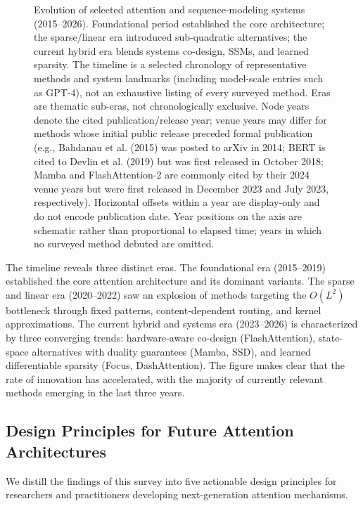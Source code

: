 \documentclass[10pt,twocolumn]{article}
\begin{document}
\begin{figure}[!tbp]
\centering
\resizebox{\textwidth}{!}{}
\caption{Evolution of selected attention and sequence-modeling systems (2015--2026). Foundational period established the core architecture; the sparse/linear era introduced sub-quadratic alternatives; the current hybrid era blends systems co-design, SSMs, and learned sparsity. The timeline is a selected chronology of representative methods and system landmarks (including model-scale entries such as GPT-4), not an exhaustive listing of every surveyed method. Eras are thematic sub-eras, not chronologically exclusive. Node years denote the cited publication/release year; venue years may differ for methods whose initial public release preceded formal publication (e.g., Bahdanau et al. (2015) was posted to arXiv in 2014; BERT is cited to Devlin et al. (2019) but was first released in October 2018; Mamba and FlashAttention-2 are commonly cited by their 2024 venue years but were first released in December 2023 and July 2023, respectively). Horizontal offsets within a year are display-only and do not encode publication date. Year positions on the axis are schematic rather than proportional to elapsed time; years in which no surveyed method debuted are omitted.}
\label{fig:timeline}
\end{figure}

The timeline reveals three distinct eras. The foundational era (2015--2019) established the core attention architecture and its dominant variants. The sparse and linear era (2020--2022) saw an explosion of methods targeting the $O(L^2)$ bottleneck through fixed patterns, content-dependent routing, and kernel approximations. The current hybrid and systems era (2023--2026) is characterized by three converging trends: hardware-aware co-design (FlashAttention), state-space alternatives with duality guarantees (Mamba, SSD), and learned differentiable sparsity (Focus, DashAttention). The figure makes clear that the rate of innovation has accelerated, with the majority of currently relevant methods emerging in the last three years.

\subsection*{Design Principles for Future Attention Architectures}

We distill the findings of this survey into five actionable design principles for researchers and practitioners developing next-generation attention mechanisms.
\end{document}
